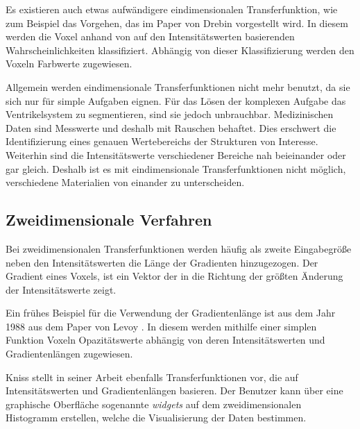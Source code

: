 Es existieren auch etwas aufwändigere eindimensionalen Transferfunktion, wie zum Beispiel das Vorgehen, das im Paper von Drebin \cite{drebin1988volume} vorgestellt wird. In diesem werden die Voxel anhand von auf den Intensitätswerten basierenden Wahrscheinlichkeiten klassifiziert. Abhängig von dieser Klassifizierung werden den Voxeln Farbwerte zugewiesen.

Allgemein werden eindimensionale Transferfunktionen nicht mehr benutzt, da sie sich nur für simple Aufgaben eignen.
Für das Lösen der komplexen Aufgabe das Ventrikelsystem zu segmentieren, sind sie jedoch unbrauchbar. Medizinischen Daten sind Messwerte und deshalb mit Rauschen behaftet. Dies erschwert die Identifizierung eines genauen Wertebereichs der Strukturen von Interesse. Weiterhin sind die Intensitätswerte verschiedener Bereiche nah beieinander oder gar gleich. Deshalb ist es mit eindimensionale Transferfunktionen nicht möglich, verschiedene Materialien von einander zu unterscheiden.



\subsection{Zweidimensionale Verfahren}

Bei zweidimensionalen Transferfunktionen werden häufig als zweite Eingabegröße neben den Intensitätswerten die Länge der Gradienten hinzugezogen. Der Gradient eines Voxels, ist ein Vektor der in die Richtung der größten Änderung der Intensitätswerte zeigt.


Ein frühes Beispiel für die Verwendung der Gradientenlänge ist aus dem Jahr 1988 aus dem Paper von Levoy \cite{levoy1988display}. In diesem werden mithilfe einer simplen Funktion Voxeln Opazitätswerte abhängig von deren Intensitätswerten und Gradientenlängen zugewiesen.


Kniss stellt in seiner Arbeit \cite{kniss2002multidimensional} ebenfalls Transferfunktionen vor, die auf Intensitätswerten und Gradientenlängen basieren. Der Benutzer kann über eine graphische Oberfläche sogenannte \textit{widgets} auf dem zweidimensionalen Histogramm erstellen, welche die Visualisierung der Daten bestimmen.



